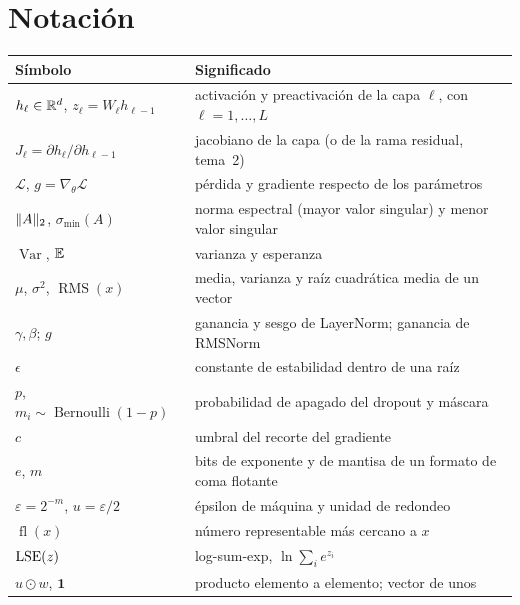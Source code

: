 \documentclass[11pt,a4paper,twoside,openany]{book}
\newcommand{\uno}{\mathbf{1}}
\newcommand{\Var}{\operatorname{Var}}
\newcommand{\RMS}{\operatorname{RMS}}
\newcommand{\Bern}{\operatorname{Bernoulli}}
\newcommand{\fl}{\operatorname{fl}}
\newcommand{\smin}{\sigma_{\min}}
\newcommand{\Loss}{\mathcal{L}}
\begin{document}
\section*{Notación}
\begin{center}
\begin{tabular}{@{}ll@{}}
\toprule
Símbolo & Significado \\
\midrule
$h_\ell\in\mathbb{R}^{d}$, $z_\ell=W_\ell h_{\ell-1}$ & activación y preactivación de la capa $\ell$, con $\ell=1,\dots,L$ \\
$J_\ell=\partial h_\ell/\partial h_{\ell-1}$ & jacobiano de la capa (o de la rama residual, tema~2) \\
$\Loss$, $g=\nabla_\theta\Loss$ & pérdida y gradiente respecto de los parámetros \\
$\lVert A\rVert_2$, $\smin(A)$ & norma espectral (mayor valor singular) y menor valor singular \\
$\Var$, $\mathbb{E}$ & varianza y esperanza \\
$\mu$, $\sigma^{2}$, $\RMS(x)$ & media, varianza y raíz cuadrática media de un vector \\
$\gamma,\beta$; $g$ & ganancia y sesgo de LayerNorm; ganancia de RMSNorm \\
$\epsilon$ & constante de estabilidad dentro de una raíz \\
$p$, $m_i\sim\Bern(1-p)$ & probabilidad de apagado del dropout y máscara \\
$c$ & umbral del recorte del gradiente \\
$e$, $m$ & bits de exponente y de mantisa de un formato de coma flotante \\
$\varepsilon=2^{-m}$, $u=\varepsilon/2$ & épsilon de máquina y unidad de redondeo \\
$\fl(x)$ & número representable más cercano a $x$ \\
$\operatorname{LSE}(z)$ & log-sum-exp, $\ln\sum_i e^{z_i}$ \\
$u\odot w$, $\uno$ & producto elemento a elemento; vector de unos \\
\bottomrule
\end{tabular}
\end{center}


\tableofcontents

\mainmatter







\backmatter

\end{document}
